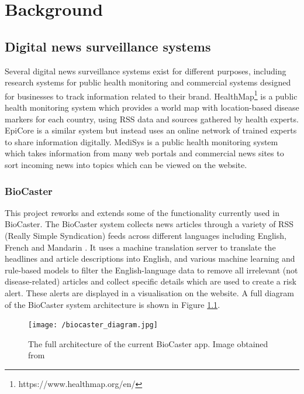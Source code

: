 \documentclass{l4proj}
\begin{document}
\chapter{Background}
\section{Digital news surveillance systems}

Several digital news surveillance systems exist for different purposes, including research systems for public health monitoring and commercial systems designed for businesses to track information related to their brand. HealthMap\footnote{https://www.healthmap.org/en/} is a public health monitoring system which provides a world map with location-based disease markers for each country, using RSS data and sources gathered by health experts. EpiCore \citep{haddad2016epicore} is a similar system but instead uses an online network of trained experts to share information digitally. MediSys \citep{steinberger2008medisys} is a public health monitoring system which takes information from many web portals and commercial news sites to sort incoming news into topics which can be viewed on the website. \par

\subsection{BioCaster}
This project reworks and extends some of the functionality currently used in BioCaster. The BioCaster system collects news articles through a variety of RSS (Really Simple Syndication) feeds across different languages including English, French and Mandarin \citep{collier2008biocaster}. It uses a machine translation server to translate the headlines and article descriptions into English, and various machine learning and rule-based models to filter the English-language data to remove all irrelevant (not disease-related) articles and collect specific details which are used to create a risk alert. These alerts are displayed in a visualisation on the website. A full diagram of the BioCaster system architecture is shown in Figure \ref{fig:biocaster_architecture}. 
 \begin{figure}[h]
 \centering
\texttt{[image: /biocaster\_diagram.jpg]}
\caption{The full architecture of the current BioCaster app. Image obtained from \cite{meng2022biocaster}}
\label{fig:biocaster_architecture}
\end{figure}
\par
\end{document}

